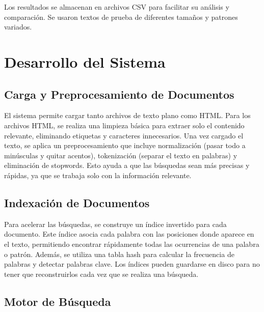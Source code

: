 \documentclass[9pt,letterpaper,onecolumn]{rho-class/rho}
\begin{document}
Los resultados se almacenan en archivos CSV para facilitar su análisis y comparación. Se usaron textos de prueba de diferentes tamaños y patrones variados.


\section{Desarrollo del Sistema}

\subsection{Carga y Preprocesamiento de Documentos}

El sistema permite cargar tanto archivos de texto plano como HTML. Para los archivos HTML, se realiza una limpieza básica para extraer solo el contenido relevante, eliminando etiquetas y caracteres innecesarios. Una vez cargado el texto, se aplica un preprocesamiento que incluye normalización (pasar todo a minúsculas y quitar acentos), tokenización (separar el texto en palabras) y eliminación de stopwords. Esto ayuda a que las búsquedas sean más precisas y rápidas, ya que se trabaja solo con la información relevante.

\subsection{Indexación de Documentos}

Para acelerar las búsquedas, se construye un índice invertido para cada documento. Este índice asocia cada palabra con las posiciones donde aparece en el texto, permitiendo encontrar rápidamente todas las ocurrencias de una palabra o patrón. Además, se utiliza una tabla hash para calcular la frecuencia de palabras y detectar palabras clave. Los índices pueden guardarse en disco para no tener que reconstruirlos cada vez que se realiza una búsqueda.


\subsection{Motor de Búsqueda}
\end{document}
